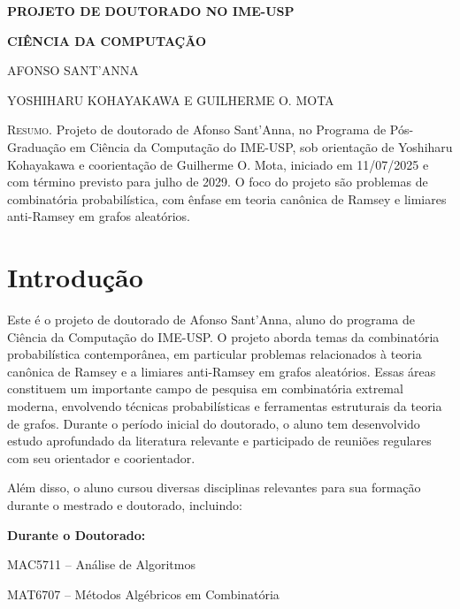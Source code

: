 \documentclass[reqno, 12pt]{amsart}
\date{}
\newenvironment{packed_itemize}{
\begin{itemize}
  \setlength{\itemsep}{2pt}
  \setlength{\parskip}{0pt}
  \setlength{\parsep}{0pt}
}{\end{itemize}}
\numberwithin{equation}{section}
\theoremstyle{definition}
\theoremstyle{plain}
\begin{document}
\begin{center}

{ \textbf{PROJETO DE DOUTORADO NO IME-USP}}

\vspace{0.3cm}

{ \textbf{CIÊNCIA DA COMPUTAÇÃO}}

\vspace{0.8cm}

AFONSO SANT'ANNA

\vspace{0.2cm}

YOSHIHARU KOHAYAKAWA E GUILHERME O. MOTA

\end{center}

\vspace{1cm}

\noindent
\textsc{Resumo.}
Projeto de doutorado de Afonso Sant'Anna, no Programa de Pós-Graduação em
Ciência da Computação do IME-USP, sob orientação de Yoshiharu Kohayakawa
e coorientação de Guilherme O. Mota, iniciado em 11/07/2025 e com término previsto para julho de 2029.
O foco do projeto são problemas de combinatória probabilística,
com ênfase em teoria canônica de Ramsey e limiares anti-Ramsey
em grafos aleatórios.

\vspace{1cm}

\section{Introdução}

Este é o projeto de doutorado de Afonso Sant'Anna, aluno do programa de
Ciência da Computação do IME-USP. O projeto aborda temas da combinatória
probabilística contemporânea, em particular problemas relacionados à
teoria canônica de Ramsey e a limiares anti-Ramsey em grafos aleatórios.
Essas áreas constituem um importante campo de pesquisa em combinatória
extremal moderna, envolvendo técnicas probabilísticas e ferramentas estruturais da teoria de grafos. Durante o período inicial do doutorado, o aluno tem desenvolvido estudo
aprofundado da literatura relevante e participado de reuniões regulares
com seu orientador e coorientador.

Além disso, o aluno cursou diversas disciplinas relevantes para sua
formação durante o mestrado e doutorado, incluindo:

\textbf{Durante o Doutorado:}
\begin{packed_itemize}
  \item MAC5711 -- Análise de Algoritmos 
  \item MAT6707 -- Métodos Algébricos em Combinatória
\end{packed_itemize}
\end{document}
